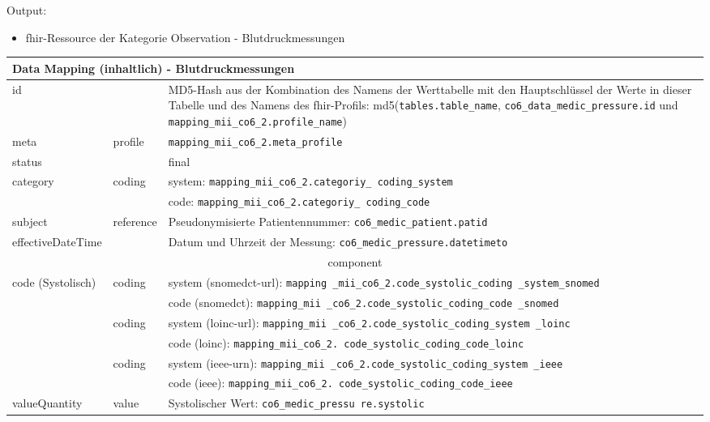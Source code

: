 Output:
\begin{itemize}
	\item \ac{fhir}-Ressource der Kategorie \glqq Observation\grqq{} - Blutdruckmessungen
\end{itemize}
\clearpage
\begin{longtable}{|l|l|p{7cm}|} 
	\hline
	\multicolumn{3}{|l|}{\bfseries Data Mapping (inhaltlich) - Blutdruckmessungen} \\ \hline
	id &  & MD5-Hash aus der Kombination des Namens der Werttabelle mit den Hauptschlüssel der Werte in dieser Tabelle und des Namens des \ac{fhir}-Profils: md5(\texttt{tables.table\_name}, \texttt{co6\_data\_medic\_pressure.id} und \texttt{mapping\_mii\_co6\_2.profile\_name}) \\ \hline
	meta & profile & \texttt{mapping\_mii\_co6\_2.meta\_profile} \\ \hline 
	status &  & final  \\ \hline 
	category & coding & system: \texttt{mapping\_mii\_co6\_2.categoriy\_ coding\_system} \\ 
	\cline{3-3}
	& & code: \texttt{mapping\_mii\_co6\_2.categoriy\_ coding\_code} \\ \hline
	subject & reference & Pseudonymisierte Patientennummer: \texttt{co6\_medic\_patient.patid} \\ \hline	
	effectiveDateTime & & Datum und Uhrzeit der Messung:  \texttt{co6\_medic\_pressure.datetimeto} \\ \hline
	\multicolumn{3}{|c|}{component} \\ \hline
	code (Systolisch) & coding & system (\ac{snomedct}-\acs{url}): \texttt{mapping \_mii\_co6\_2.code\_systolic\_coding \_system\_snomed} \\ 
	\cline{3-3} 
	&  & code (\ac{snomedct}): \texttt{mapping\_mii \_co6\_2.code\_systolic\_coding\_code \_snomed} \\
	\cline{2-3} 
	&  coding & system (\ac{loinc}-\ac{url}): \texttt{mapping\_mii \_co6\_2.code\_systolic\_coding\_system \_loinc} \\ 
	\cline{3-3} 
	&  & code (\ac{loinc}): \texttt{mapping\_mii\_co6\_2. code\_systolic\_coding\_code\_loinc} \\ 
	\cline{2-3} 
	&  coding & system (\ac{ieee}-\acs{urn}): \texttt{mapping\_mii \_co6\_2.code\_systolic\_coding\_system \_ieee} \\ 
	\cline{3-3} 
	&  & code (\ac{ieee}): \texttt{mapping\_mii\_co6\_2. code\_systolic\_coding\_code\_ieee} \\ \hline
	valueQuantity & value & Systolischer Wert: \texttt{co6\_medic\_pressu re.systolic} \\

\end{longtable}
